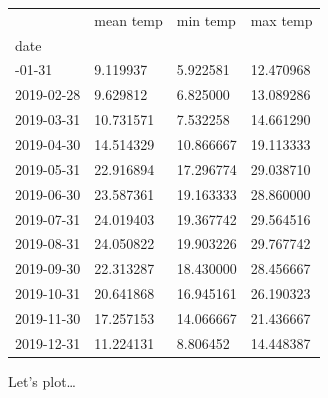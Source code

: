 \documentclass[
  letterpaper,
  DIV=11,
  numbers=noendperiod,
  oneside]{scrreprt}
\begin{document}
\begin{longtable}[]{@{}llll@{}}
\toprule\noalign{}
& mean temp & min temp & max temp \\
date & & & \\
\midrule\noalign{}
\endhead
\bottomrule\noalign{}
\endlastfoot
2019-01-31 & 9.119937 & 5.922581 & 12.470968 \\
2019-02-28 & 9.629812 & 6.825000 & 13.089286 \\
2019-03-31 & 10.731571 & 7.532258 & 14.661290 \\
2019-04-30 & 14.514329 & 10.866667 & 19.113333 \\
2019-05-31 & 22.916894 & 17.296774 & 29.038710 \\
2019-06-30 & 23.587361 & 19.163333 & 28.860000 \\
2019-07-31 & 24.019403 & 19.367742 & 29.564516 \\
2019-08-31 & 24.050822 & 19.903226 & 29.767742 \\
2019-09-30 & 22.313287 & 18.430000 & 28.456667 \\
2019-10-31 & 20.641868 & 16.945161 & 26.190323 \\
2019-11-30 & 17.257153 & 14.066667 & 21.436667 \\
2019-12-31 & 11.224131 & 8.806452 & 14.448387 \\
\end{longtable}

Let's plot\ldots{}
\end{document}
